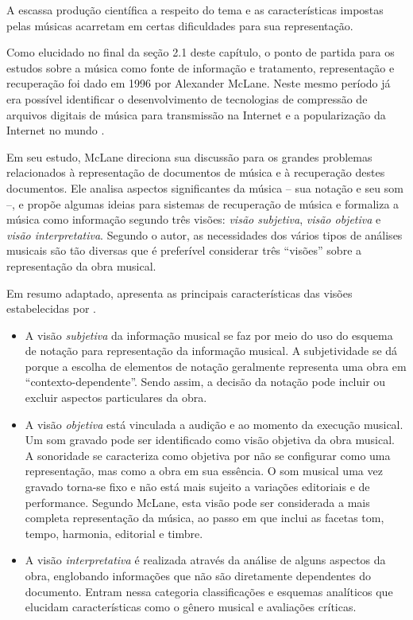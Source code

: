 A escassa produção científica a respeito do tema e as características impostas pelas músicas acarretam em certas dificuldades para sua representação.

Como elucidado no final da seção 2.1 deste capítulo, o ponto de partida para os estudos sobre a música como fonte de informação e tratamento, representação e recuperação foi dado em 1996 por Alexander McLane. Neste mesmo período já era possível identificar o desenvolvimento de tecnologias de compressão de arquivos digitais de música para transmissão na Internet e a popularização da Internet no mundo \cite{santini&souza2007}.

Em seu estudo, McLane direciona sua discussão para os grandes problemas relacionados à representação de documentos de música e à recuperação destes documentos. Ele analisa aspectos significantes da música – sua notação e seu som –, e propõe algumas ideias para sistemas de recuperação de música e formaliza a música como informação segundo três visões: \textit{visão subjetiva}, \textit{visão objetiva} e \textit{visão interpretativa}. Segundo o autor, as necessidades dos vários tipos de análises musicais são tão diversas que é preferível considerar três “visões” sobre a representação da obra musical.

Em resumo adaptado,  apresenta as principais características das visões estabelecidas por .

\begin{itemize}
    \item A visão \textit{subjetiva} da informação musical se faz por meio do uso do esquema de notação para representação da informação musical. A subjetividade se dá porque a escolha de elementos de notação geralmente representa uma obra em “contexto-dependente”. Sendo assim, a decisão da notação pode incluir ou excluir aspectos particulares da obra.
    \item A visão \textit{objetiva} está vinculada a audição e ao momento da execução musical. Um som gravado pode ser identificado como visão objetiva da obra musical. A sonoridade se caracteriza como objetiva por não se configurar como uma representação, mas como a obra em sua essência. O som musical uma vez gravado torna-se fixo e não está mais sujeito a variações editoriais e de performance. Segundo McLane, esta visão pode ser considerada a mais completa representação da música, ao passo em que inclui as facetas tom, tempo, harmonia, editorial e timbre.
    \item A visão \textit{interpretativa} é realizada através da análise de alguns aspectos da obra, englobando informações que não são diretamente dependentes do documento. Entram nessa categoria classificações e esquemas analíticos que elucidam características como o gênero musical e avaliações críticas.
\end{itemize}

